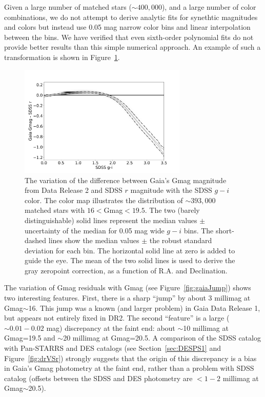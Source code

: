 Given a large number of matched stars ($\sim 400,000$), and a large number of color combinations,
we do not attempt to derive analytic fits for synethtic magnitudes and colors but instead
use 0.05 mag narrow color bins and linear interpolation between the bins. We have verified
that even sixth-order polynomial fits do not provide better results than this simple 
numerical approach. An example of such a transformation is shown in Figure~\ref{fig:GrVSgi}. 


\begin{figure}[th!]
  \centering\includegraphics[width=8cm]{figures/GrVSgi.png} 
\caption{The variation of the difference between Gaia's Gmag magnitude from Data Release 2
and SDSS $r$ magnitude with the SDSS $g-i$ color.
The  color map illustrates the distribution of $\sim 393,000$ matched stars with 
$16<$Gmag$<19.5$. The two (barely distinguishable) solid lines represent the median 
values $\pm$ uncertainty of the median for 0.05 mag wide $g-i$ bins. The short-dashed 
lines show the median values $\pm$ the robust standard deviation for 
each bin. The horizontal solid line at zero is added to guide the eye. The mean of 
the two solid lines is used to derive the gray zeropoint correction, as a function of R.A.
and Declination.}
\label{fig:GrVSgi}
\end{figure}


The variation of Gmag residuals with Gmag (see Figure~\ref{fig:gaiaJump}) shows two 
interesting features. First, there is a sharp
``jump'' by about 3 millimag at Gmag$\sim$16.  This jump was a known (and 
larger problem) in Gaia Data Release 1, but appears not entirely fixed in DR2. The 
second ``feature'' is a large ($\sim0.01-0.02$ mag) discrepancy at the faint end:
about $\sim$10 millimag at Gmag=19.5 and $\sim$20 millimag at Gmag=20.5. 
A comparison of the SDSS catalog with Pan-STARRS and DES catalogs (see 
Section~\ref{sec:DESPS1} and Figure~\ref{fig:drVSr}) strongly suggests that the
origin of this discrepancy is a bias in Gaia's Gmag photometry at the faint end, rather 
than a problem with SDSS catalog (offsets between the SDSS and DES
photometry are $<1-2$ millimag at Gmag$\sim$20.5). 
 

